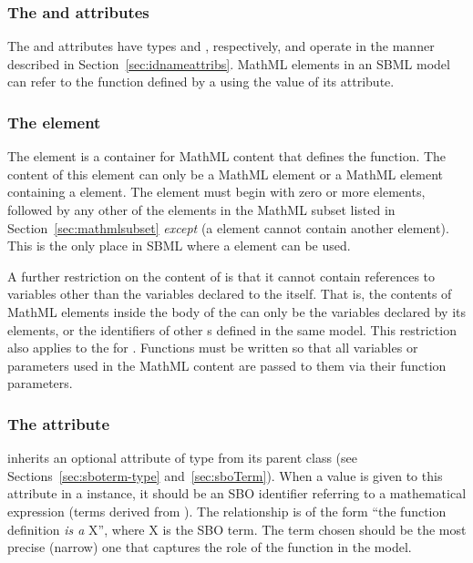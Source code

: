 \subsubsection{The  and  attributes}

The  and  attributes have types 
and , respectively, and operate in the manner
described in Section~\ref{sec:idnameattribs}.  MathML 
elements in an SBML model can refer to the function defined by a
\FunctionDefinition using the value of its  attribute.


\subsubsection{The  element}
\label{sec:function-definition-math}



The  element is a container for MathML
content that defines the function.  The content of this
element can only be a MathML  element
or a MathML  element containing a
   element.  The  element must begin
with zero or more  elements, followed by any other of
the elements in the MathML subset listed in
Section~\ref{sec:mathmlsubset} \emph{except}  (\ie a
 element cannot contain another 
element).  This is the only place in SBML where a 
element can be used.



A further restriction on the content of  is that it
cannot contain references to variables other than the variables
declared to the  itself.  That is, the contents of
MathML  elements inside the body of the 
can only be the variables declared by its  elements,
or the identifiers of other \FunctionDefinition{}s defined in
the same model.  This restriction also applies to the
   for .  Functions must be written
so that all variables or parameters used in the MathML content are
passed to them via their function parameters.


\subsubsection{The  attribute}
\label{sec:functiondefinition-sboterm}

\FunctionDefinition inherits an optional 
attribute of type  from its parent
class \SBase (see Sections~\ref{sec:sboterm-type}
and~\ref{sec:sboTerm}).  When a value is given to this
attribute in a \FunctionDefinition instance, it should be an
SBO identifier referring to a mathematical expression
(\ie terms derived from \sbomathformula).  The relationship is
of the form ``the function definition \emph{is a} X'', where X is
the SBO term.  The term chosen should be the most precise (narrow)
one that captures the role of the function in the model.

